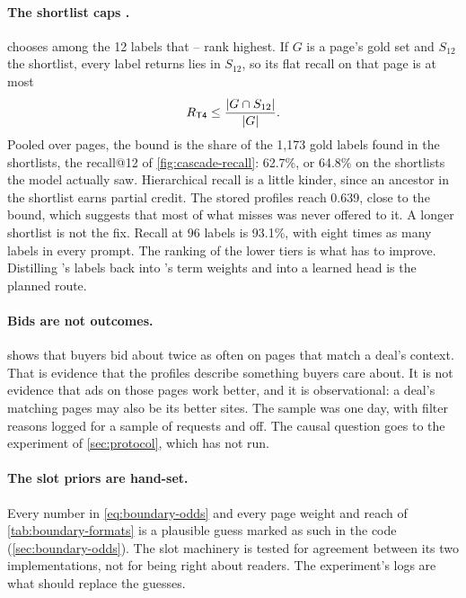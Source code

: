 \paragraph{The shortlist caps .}  chooses among the 12 labels that -- rank highest. If $G$ is a page's gold set and $S_{12}$ the shortlist, every label  returns lies in $S_{12}$, so its flat recall on that page is at most
\begin{equation}\label{eq:discussion-cap}
  R_{\textsf{T4}} \le \frac{|G \cap S_{12}|}{|G|}.
\end{equation}
Pooled over pages, the bound is the share of the 1,173 gold labels found in the shortlists, the recall@12 of \cref{fig:cascade-recall}: 62.7\%, or 64.8\% on the shortlists the model actually saw. Hierarchical recall is a little kinder, since an ancestor in the shortlist earns partial credit. The stored  profiles reach \hR{} 0.639, close to the bound, which suggests that most of what  misses was never offered to it. A longer shortlist is not the fix. Recall at 96 labels is 93.1\%, with eight times as many labels in every prompt. The ranking of the lower tiers is what has to improve. Distilling 's labels back into 's term weights and into a learned  head is the planned route.

\paragraph{Bids are not outcomes.}  shows that buyers bid about twice as often on pages that match a deal's context. That is evidence that the profiles describe something buyers care about. It is not evidence that ads on those pages work better, and it is observational: a deal's matching pages may also be its better sites. The sample was one day, with filter reasons logged for a sample of requests and  off. The causal question goes to the experiment of \cref{sec:protocol}, which has not run.

\paragraph{The slot priors are hand-set.} Every number in \cref{eq:boundary-odds} and every page weight and reach of \cref{tab:boundary-formats} is a plausible guess marked as such in the code (\cref{sec:boundary-odds}). The slot machinery is tested for agreement between its two implementations, not for being right about readers. The experiment's logs are what should replace the guesses.

